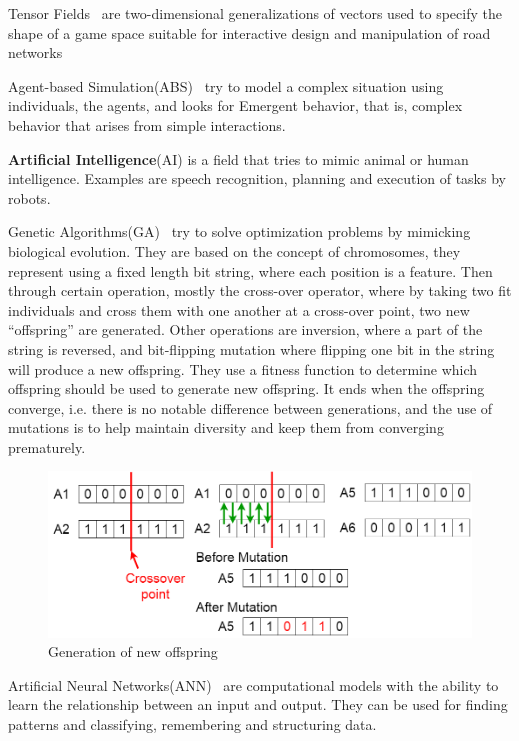 \documentclass[runningheads]{llncs}
\begin{document}
Tensor Fields~\cite{ref_chentensor} are two-dimensional generalizations of vectors used to specify the shape of a game space suitable for interactive design and manipulation of road networks

Agent-based Simulation(ABS)~\cite{ref_davidsson} try to model a complex situation using individuals, the agents, and looks for Emergent behavior, that is, complex behavior that arises from simple interactions.

\textbf{Artificial Intelligence}(AI) is a field  that tries to mimic animal or human intelligence. Examples are speech recognition, planning and execution of tasks by robots.

Genetic Algorithms(GA)~\cite{ref_goldberg} try to solve optimization problems by mimicking biological evolution. They are based on the concept of chromosomes, they represent using a fixed length bit string, where each position is a feature. Then through certain operation, mostly the cross-over operator, where by taking two fit individuals and cross them with one another at a cross-over point, two new “offspring” are generated. Other operations are inversion, where a part of the string is reversed, and bit-flipping mutation where flipping one bit in the string will produce a new offspring. They use a fitness function to determine which offspring should be used to generate new offspring. It ends when the offspring converge, i.e. there is no notable difference between generations, and the use of mutations is to help maintain diversity and keep them from converging prematurely.  

\begin{figure}
    \centering
    \includegraphics[scale=0.30]{images/geneticalgorithm.png}
    \caption{Generation of new offspring}
    \label{fig:genetic}
\end{figure}

Artificial Neural Networks(ANN)~\cite{ref_haykin} are computational models with the ability to learn the relationship between an input and output. They can be used for finding patterns and classifying, remembering and structuring data.
\end{document}
